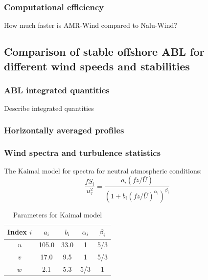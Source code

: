 \subsubsection*{Computational efficiency}
How much faster is AMR-Wind compared to Nalu-Wind?  \\

\subsection{Comparison of stable offshore ABL for different wind speeds and stabilities}

\subsubsection{ABL integrated quantities}
Describe integrated quantities

\subsubsection{Horizontally averaged profiles}

\subsubsection{Wind spectra and turbulence statistics}

The Kaimal model for spectra \cite{kaimal1973turbulence,
  cheynet2017spectral} for neutral atmospheric conditions:
\begin{equation}
  \label{eq:kaimal}
  \frac{fS_i}{u_\tau^2} = \frac{a_i(fz/\bar{U})}{\left(1+b_i(fz/\bar{U})^{\alpha_i}\right)^{\beta_i}}
\end{equation}

\begin{table}[h]
\caption{\label{tab:KaimalParameters} Parameters for Kaimal model}
\centering
\begin{tabular}{ccccc}
  \hline
  Index $i$& $a_i$ & $b_i$ & $\alpha_i$  & $\beta_i$ \\
  \hline
  $u$      & 105.0 & 33.0  & 1           & 5/3  \\
  $v$      &  17.0 &  9.5  & 1           & 5/3  \\
  $w$      &   2.1 &  5.3  & 5/3         &   1  \\
\hline
\end{tabular}
\end{table}


